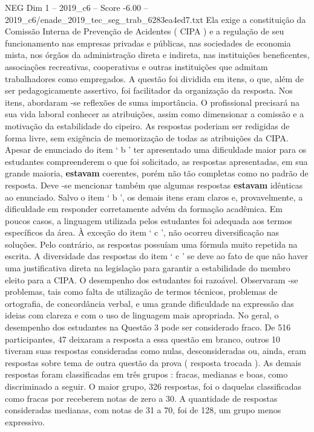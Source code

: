 \begin{textsample}{NEG Dim 1 – 2019\_c6 – Score -6.00 – 2019\_c6/enade\_2019\_tec\_seg\_trab\_6283ea4ed7.txt}
Ela exige a constituição da Comissão Interna de Prevenção de Acidentes ( CIPA ) e a regulação de seu funcionamento nas empresas privadas e públicas, nas sociedades de economia mista, nos órgãos da administração direta e indireta, nas instituições beneficentes, associações recreativas, cooperativas e outras instituições que admitam trabalhadores como empregados.
A questão foi dividida em itens, o que, além de ser pedagogicamente assertivo, foi facilitador da organização da resposta.
Nos itens, abordaram -se reflexões de suma importância.
O profissional precisará na sua vida laboral conhecer as atribuições, assim como dimensionar a comissão e a motivação da estabilidade do cipeiro.
As respostas poderiam ser redigidas de forma livre, sem exigência de memorização de todas as atribuições da CIPA.
Apesar de enunciado do item ‘ b ’ ter apresentado uma dificuldade maior para os estudantes compreenderem o que foi solicitado, as respostas apresentadas, em sua grande maioria, \textbf{estavam} coerentes, porém não tão completas como no padrão de resposta.
Deve -se mencionar também que algumas respostas \textbf{estavam} idênticas ao enunciado.
Salvo o item ‘ b ’, os demais itens eram claros e, provavelmente, a dificuldade em responder corretamente advém da formação acadêmica.
Em poucos casos, a linguagem utilizada pelos estudantes foi adequada aos termos específicos da área.
À exceção do item ‘ c ’, não ocorreu diversificação nas soluções.
Pelo contrário, as respostas possuíam uma fórmula muito repetida na escrita.
A diversidade das respostas do item ‘ c ’ se deve ao fato de que não haver uma justificativa direta na legislação para garantir a estabilidade do membro eleito para a CIPA.
O desempenho dos estudantes foi razoável.
Observaram -se problemas, tais como falta de utilização de termos técnicos, problemas de ortografia, de concordância verbal, e uma grande dificuldade na expressão das ideias com clareza e com o uso de linguagem mais apropriada.
No geral, o desempenho dos estudantes na Questão 3 pode ser considerado fraco.
De 516 participantes, 47 deixaram a resposta a essa questão em branco, outros 10 tiveram suas respostas consideradas como nulas, desconsideradas ou, ainda, eram respostas sobre tema de outra questão da prova ( resposta trocada ).
As demais respostas foram classificadas em três grupos : fracas, medianas e boas, como discriminado a seguir.
O maior grupo, 326 respostas, foi o daquelas classificadas como fracas por receberem notas de zero a 30.
A quantidade de respostas consideradas medianas, com notas de 31 a 70, foi de 128, um grupo menos expressivo.

\end{textsample}
